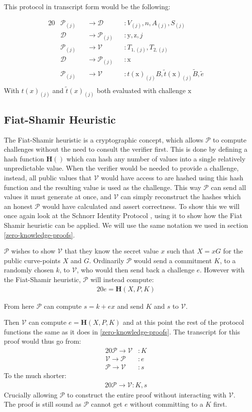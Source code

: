 \documentclass{article}
\newcommand{\eq}[1]{\begin{alignat*}{20}#1\end{alignat*}}
\newcommand{\ran}[1]{\mathrm{#1}}
\newcommand{\V}{\mathcal{V}}
\renewcommand{\P}{\mathcal{P}}
\newcommand{\D}{\mathcal{D}}
\newcommand{\blind}[1]{\widetilde{#1}}
\newcommand{\bt}{\blind{t}}
\newcommand{\bB}{\blind{B}}
\newcommand{\be}{\blind{e}}
\begin{document}
This protocol in transcript form would be the following: 

\eq{
	&\P_{(j)} &&\rightarrow \D &&: V_{(j)}, n, A_{(j)}, S_{(j)} \\
	&\D &&\rightarrow \P_{(j)} &&: \ran{y}, \ran{z}, j \\
	&\P_{(j)} &&\rightarrow \V &&: T_{1, (j)}, T_{2,(j)} \\
	&\D &&\rightarrow \P_{(j)} &&: \ran{x} \\
	&\P_{(j)} &&\rightarrow \V &&: t(\ran{x})_{(j)} B, \bt(\ran{x})_{(j)}\bB, \be \\
}
With $t(x)_{(j)}$ and $\bt(x)_{(j)}$ both evaluated with challenge $\ran{x}$

\subsection{Fiat-Shamir Heuristic}\label{fiat-shamir-heuristic}

The Fiat-Shamir heuristic \cite{zkdocs-fiat-shamir} is a cryptographic concept, which allows
$\P$ to compute challenges without the need to consult the verifier
first. This is done by defining a hash function $\textbf{H}()$ which
can hash any number of values into a single relatively unpredictable
value. When the verifier would be needed to provide a challenge,
instead, all public values that $\V$ would have access to are
hashed using this hash function and the resulting value is used as
the challenge. This way $\P$ can send all values it must generate at
once, and $\V$ can simply reconstruct the hashes which an honest $\P$
would have calculated and assert correctness. To show this we will
once again look at the Schnorr Identity Protocol \cite{zkdocs-schnorr}, using it to show
how the Fiat Shamir heuristic can be applied. We will use the same
notation we used in section \ref{zero-knowledge-proofs}.

$\P$ wishes to show $\V$ that they know the secret value $x$ such that
$X = xG$ for the public curve-points $X$ and $G$. Ordinarily $\P$ would
send a commitment $K$, to a randomly chosen $k$, to $\V$, who would
then send back a challenge $e$. However with the Fiat-Shamir heuristic,
$\P$ will instead compute:
\eq{
	e = \textbf{H}(X,P,K)
}

From here $\P$ can compute $s = k + ex$ and send $K$ and $s$ to $\V$.

Then $\V$ can compute $e = \textbf{H}(X,P,K)$ and at this
point the rest of the protocol functions the same as it does in
\ref{zero-knowledge-proofs}. The transcript for this proof would thus go from:
\eq{
	\P \rightarrow \V &: K \\
	\V \rightarrow \P &: e \\
	\P \rightarrow \V &: s
}
To the much shorter:
\eq{
	\P \rightarrow \V: K, s
}
Crucially allowing $\P$ to construct the entire proof without
interacting with $\V$. The proof is still sound as $\P$ cannot get $e$
without committing to a $K$ first.
\end{document}
